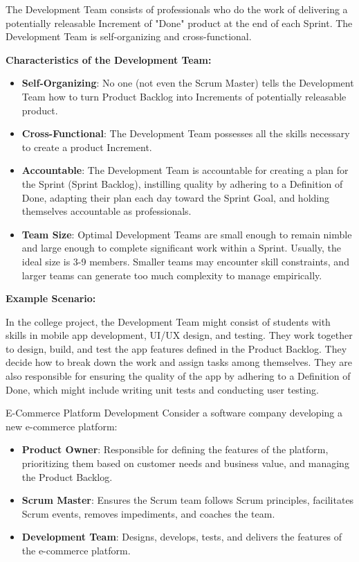 The Development Team consists of professionals who do the work of delivering a
potentially releasable Increment of "Done" product at the end of each Sprint.
The Development Team is self-organizing and cross-functional.

\textbf{Characteristics of the Development Team:}

\begin{itemize}
  \item \textbf{Self-Organizing}: No one (not even the Scrum Master) tells the Development Team how to turn Product Backlog into Increments of potentially releasable product.
  \item \textbf{Cross-Functional}: The Development Team possesses all the skills necessary to create a product Increment.
  \item \textbf{Accountable}: The Development Team is accountable for creating a plan for the Sprint (Sprint Backlog), instilling quality by adhering to a Definition of Done, adapting their plan each day toward the Sprint Goal, and holding themselves accountable as professionals.
  \item \textbf{Team Size}: Optimal Development Teams are small enough to remain nimble and large enough to complete significant work within a Sprint. Usually, the ideal size is 3-9 members. Smaller teams may encounter skill constraints, and larger teams can generate too much complexity to manage empirically.
\end{itemize}

\textbf{Example Scenario:}

In the college project, the Development Team might consist of students with
skills in mobile app development, UI/UX design, and testing. They work together
to design, build, and test the app features defined in the Product Backlog.
They decide how to break down the work and assign tasks among themselves. They
are also responsible for ensuring the quality of the app by adhering to a
Definition of Done, which might include writing unit tests and conducting user
testing.

\begin{examplecard}{E-Commerce Platform Development}
  Consider a software company developing a new e-commerce platform:
  \begin{itemize}
    \item \textbf{Product Owner}: Responsible for defining the features of the platform, prioritizing them based on customer needs and business value, and managing the Product Backlog.
    \item \textbf{Scrum Master}: Ensures the Scrum team follows Scrum principles, facilitates Scrum events, removes impediments, and coaches the team.
    \item \textbf{Development Team}: Designs, develops, tests, and delivers the features of the e-commerce platform.
  \end{itemize}
\end{examplecard}

